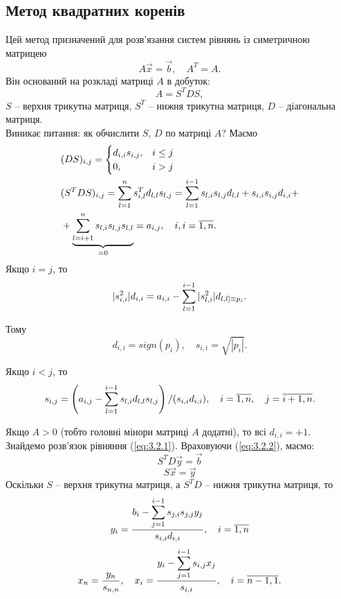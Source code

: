 \subsection{Метод квадратних коренів}
Цей метод призначений для розв'язання систем рівнянь із симетричною матрицею
\begin{equation}
	\label{eq:3.6}
	A \vec x = \vec b, \quad A^T = A.
\end{equation}
Він оснований на розкладі матриці $A$ в добуток:
\begin{equation}
	\label{eq:3.7}
	A = S^T D S,
\end{equation}
$S$ -- верхня трикутна матриця, $S^T$ -- нижня трикутна матриця, $D$ -- діагональна матриця. \\

Виникає питання: як обчислити $S$, $D$ по матриці $A$? Маємо
\begin{equation}
	\label{eq:3.8}
	\begin{aligned}
		& (DS)_{i,j} = \begin{cases} d_{i,i}s_{i,j}, & i \le j \\ 0, & i > j \end{cases} \\
		& (S^TDS)_{i,j} = \displaystyle\sum\limits_{l=1}^n s_{i,l}^T d_{l,l} s_{l, j} = \displaystyle\sum\limits_{l=1}^{i-1} s_{l,i} s_{l, j} d_{l, l} + s_{i,i} s_{i,j} d_{i,i} + \\
		& +\underset{=0}{\underbrace{\displaystyle\sum\limits_{l=i+1}^n s_{l, i} s_{l, j} s_{l,l}}} = a_{i,j}, \quad i,i = \overline{1,n}. 
	\end{aligned}
\end{equation}
Якщо $i = j$, то \[ |s_{i,i}^2|d_{i,i} = a_{i,i} - \displaystyle\sum\limits_{l=1}^{i-1} |s_{l,i}^2| d_{l,l] \equiv p_i}.\]

Тому \[ d_{i,i} = sign (p_i), \quad s_{i,i} = \sqrt{|p_i|}. \]

Якщо $i < j$, то \[ s_{i,j} = \left( a_{i,j} - \displaystyle\sum\limits_{l=1}^{i-1} s_{l,i} d_{l,l} s_{l,j} \right) / (s_{i,i} d_{i,i}), \quad i = \overline{1, n}, \quad j = \overline{i+1, n}. \]

Якщо $A > 0$ (тобто головні мінори матриці $A$ додатні), то всі $d_{i,i} = +1$. \\

Знайдемо розв’язок рівняння (\ref{eq:3.2.1}). Враховуючи (\ref{eq:3.2.2}), маємо:
\begin{equation}
	\label{eq:3.9}
	S^T D \vec y = \vec b
\end{equation}
\begin{equation}
	\label{eq:3.10}
	S \vec x = \vec y
\end{equation}
Оскільки $S$ -- верхня трикутна матриця, а $S^TD$ -- нижня трикутна матриця, то
\begin{equation}
	\label{eq:3.11}
	y_i = \dfrac{b_i - \displaystyle\sum\limits_{j=1}^{i-1} s_{j,i}s_{j,j}y_j}{s_{i,i}d_{i,i}}, \quad i=\overline{1,n}
\end{equation}
\begin{equation}
	\label{eq:3.12}
	x_n = \dfrac{y_n}{s_{n,n}}, \quad x_i = \dfrac{y_i - \displaystyle\sum\limits_{j=1}^{i-1} s_{i,j} x_j}{s_{i,i}}, \quad i=\overline{n-1,1}.
\end{equation}

